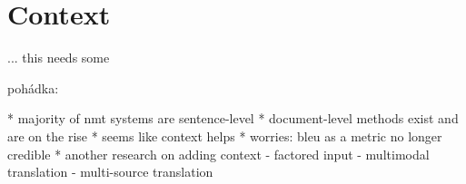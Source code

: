\chapter{Context}
\label{chap:context}

\begin{markdown}
... this needs some

pohádka:

* majority of nmt systems are sentence-level
* document-level methods exist and are on the rise
* seems like context helps
* worries: bleu as a metric no longer credible
* another research on adding context
    - factored input
	- multimodal translation
	- multi-source translation
	

\end{markdown}
